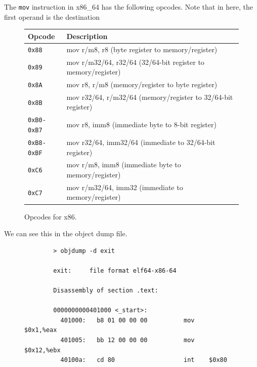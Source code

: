   \begin{example}
    The \texttt{mov} instruction in x86\_64 has the following opcodes. Note that in here, the first operand is the destination 

    \begin{figure}[H]
      \centering 
      \begin{tabular}{|l|l|}
        \hline
        \textbf{Opcode} & \textbf{Description} \\
        \hline
        \texttt{0x88} & mov r/m8, r8 (byte register to memory/register) \\
        \hline
        \texttt{0x89} & mov r/m32/64, r32/64 (32/64-bit register to memory/register) \\
        \hline
        \texttt{0x8A} & mov r8, r/m8 (memory/register to byte register) \\
        \hline
        \texttt{0x8B} & mov r32/64, r/m32/64 (memory/register to 32/64-bit register) \\
        \hline
        \texttt{0xB0-0xB7} & mov r8, imm8 (immediate byte to 8-bit register) \\
        \hline
        \texttt{0xB8-0xBF} & mov r32/64, imm32/64 (immediate to 32/64-bit register) \\
        \hline
        \texttt{0xC6} & mov r/m8, imm8 (immediate byte to memory/register) \\
        \hline
        \texttt{0xC7} & mov r/m32/64, imm32 (immediate to memory/register) \\
        \hline
      \end{tabular}
      \caption{Opcodes for x86.} 
    \end{figure}

    We can see this in the object dump file. 
      
    \begin{figure}[H]
      \centering 
      \begin{lstlisting}
        > objdump -d exit

        exit:     file format elf64-x86-64

        Disassembly of section .text:

        0000000000401000 <_start>:
          401000:	b8 01 00 00 00       	mov    $0x1,%eax
          401005:	bb 12 00 00 00       	mov    $0x12,%ebx
          40100a:	cd 80                	int    $0x80
      \end{lstlisting}
      \caption{} 
    \end{figure}
  \end{example}

